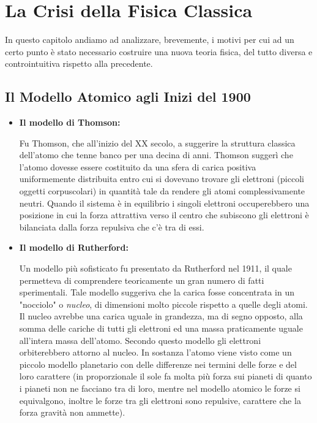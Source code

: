 \chapter{La Crisi della Fisica Classica}

	In questo capitolo andiamo ad analizzare, brevemente, i motivi per cui ad un certo punto è stato necessario costruire una nuova teoria fisica, del tutto diversa e controintuitiva rispetto alla precedente.
	
\section{Il Modello Atomico agli Inizi del 1900}

\begin{itemize}
	\item \textbf{Il modello di Thomson:}
		
		Fu Thomson, che all'inizio del XX secolo, a suggerire la struttura classica dell'atomo che tenne banco per una decina di anni. Thomson suggerì che l'atomo dovesse essere costituito da una sfera di carica positiva uniformemente distribuita entro cui si dovevano trovare gli elettroni (piccoli oggetti corpuscolari) in quantità tale da rendere gli atomi complessivamente neutri. Quando il sistema è in equilibrio i singoli elettroni occuperebbero una posizione in cui la forza attrattiva verso il centro che subiscono gli elettroni è bilanciata dalla forza repulsiva che c'è tra di essi. 
		
	\item \textbf{Il modello di Rutherford:}
	
		Un modello più sofisticato fu presentato da Rutherford nel 1911, il quale permetteva di comprendere teoricamente un gran numero di fatti sperimentali. Tale modello suggeriva che la carica fosse concentrata in un "nocciolo" o \textit{nucleo}, di dimensioni molto piccole rispetto a quelle degli atomi. Il nucleo avrebbe una carica uguale in grandezza, ma di segno opposto, alla somma delle cariche di tutti gli elettroni ed una massa praticamente uguale all'intera massa dell'atomo. Secondo questo modello gli elettroni orbiterebbero attorno al nucleo. In sostanza l'atomo viene visto come un piccolo modello planetario con delle differenze nei termini delle forze e del loro carattere (in proporzionale il sole fa molta più forza sui pianeti di quanto i pianeti non ne facciano tra di loro, mentre nel modello atomico le forze si equivalgono, inoltre le forze tra gli elettroni sono repulsive, carattere che la forza gravità non ammette).
	
\end{itemize}	

